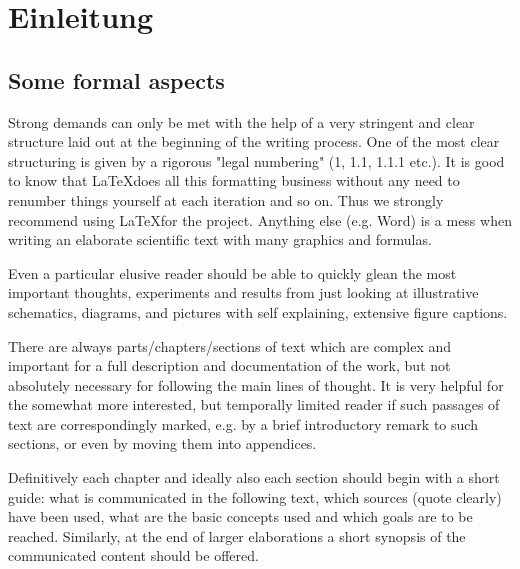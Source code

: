 %
%
%
%

\chapter{Einleitung}
\label{chap:Einleitung}

\section{Some formal aspects}
\label{sec:formalaspects}

Strong demands can only be met with the help of a very stringent and clear structure laid out at the beginning of the writing process. One of the most clear structuring is given by a rigorous "legal numbering" (1, 1.1, 1.1.1 etc.). It is good to know that \LaTeX does all this formatting business without any need to renumber things yourself at each iteration and so on. Thus we strongly recommend using \LaTeX for the project. Anything else (e.g. Word) is a mess when writing an elaborate scientific text with many graphics and formulas.

Even a particular elusive reader should be able to quickly glean the most important thoughts, experiments and results from just looking at illustrative schematics, diagrams, and pictures with self explaining, extensive figure captions.

There are always parts/chapters/sections of text which are complex and important for a full description and documentation of the work, but not absolutely necessary for following the main lines of thought. It is very helpful for the somewhat more interested, but temporally limited reader if such passages of text are correspondingly marked, e.g. by a brief introductory remark to such sections, or even by moving them into appendices.

Definitively each chapter and ideally also each section should begin with a short guide: what is communicated in the following text, which sources (quote clearly) have been used, what are the basic concepts used and which goals are to be reached. Similarly, at the end of larger elaborations a short synopsis of the communicated content should be
offered.

